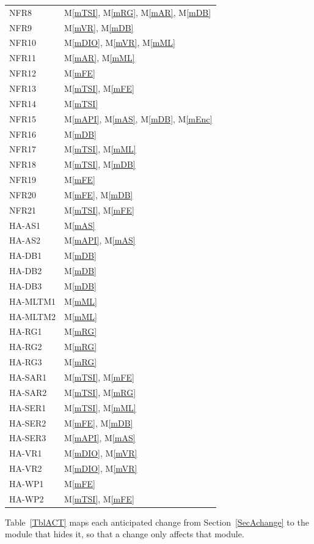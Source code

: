 \documentclass[12pt, titlepage]{article}
\newcommand{\mref}[1]{M\ref{#1}}
\begin{document}
\begin{longtable}{p{} p{}}
NFR8 & \mref{mTSI}, \mref{mRG}, \mref{mAR}, \mref{mDB}\\
NFR9 & \mref{mVR}, \mref{mDB}\\
NFR10 & \mref{mDIO}, \mref{mVR}, \mref{mML}\\
NFR11 & \mref{mAR}, \mref{mML}\\
NFR12 & \mref{mFE}\\
NFR13 & \mref{mTSI}, \mref{mFE}\\
NFR14 & \mref{mTSI}\\
NFR15 & \mref{mAPI}, \mref{mAS}, \mref{mDB}, \mref{mEnc}\\
NFR16 & \mref{mDB}\\
NFR17 & \mref{mTSI}, \mref{mML}\\
NFR18 & \mref{mTSI}, \mref{mDB}\\
NFR19 & \mref{mFE}\\
NFR20 & \mref{mFE}, \mref{mDB}\\
NFR21 & \mref{mTSI}, \mref{mFE}\\
HA-AS1 & \mref{mAS}\\
HA-AS2 & \mref{mAPI}, \mref{mAS}\\
HA-DB1 & \mref{mDB}\\
HA-DB2 & \mref{mDB}\\
HA-DB3 & \mref{mDB}\\
HA-MLTM1 & \mref{mML}\\
HA-MLTM2 & \mref{mML}\\
HA-RG1 & \mref{mRG}\\
HA-RG2 & \mref{mRG}\\
HA-RG3 & \mref{mRG}\\
HA-SAR1 & \mref{mTSI}, \mref{mFE}\\
HA-SAR2 & \mref{mTSI}, \mref{mRG}\\
HA-SER1 & \mref{mTSI}, \mref{mML}\\
HA-SER2 & \mref{mFE}, \mref{mDB}\\
HA-SER3 & \mref{mAPI}, \mref{mAS}\\
HA-VR1 & \mref{mDIO}, \mref{mVR}\\
HA-VR2 & \mref{mDIO}, \mref{mVR}\\
HA-WP1 & \mref{mFE}\\
HA-WP2 & \mref{mTSI}, \mref{mFE}\\
\bottomrule
\end{longtable}

Table~\ref{TblACT} maps each anticipated change from
Section~\ref{SecAchange} to the module that hides it, so that a change only
affects that module.
\end{document}
